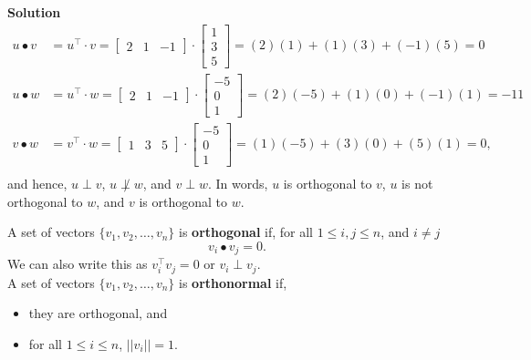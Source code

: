 \textbf{Solution} 
\begin{align*} 
u \bullet v & = u^\top \cdot v =\begin{bmatrix} 2 & 1 & -1\end{bmatrix} \cdot \begin{bmatrix} 1\\ 3\\ 5\end{bmatrix} = (2)(1) + (1) (3) + (-1)(5) = 0 \\
u \bullet w & = u^\top \cdot w =\begin{bmatrix} 2 & 1 & -1\end{bmatrix} \cdot \left[ \begin{array}{r} -5 \\ 0 \\ 1\end{array} \right] = (2)(-5) + (1) (0) + (-1)(1) = -11 \\
v \bullet w & = v^\top \cdot w =\begin{bmatrix} 1 & 3 & 5\end{bmatrix} \cdot \left[ \begin{array}{r} -5 \\ 0 \\ 1\end{array} \right] = (1)(-5) + (3) (0) + (5)(1) = 0,\\
\end{align*}
and hence, $u \perp v$, $u \not \perp w$, and $v \perp w$. In words, $u$ is orthogonal to $v$, $u$ is not orthogonal to $w$, and  $v$ is orthogonal to $w$. \Qed\\




\begin{tcolorbox}[sharp corners, colback=green!30, colframe=green!80!blue, title=\textbf{\Large Orthogonal and Orthonormal Vectors}]
A set of vectors $\{v_1, v_2, \ldots, v_n  \}$ is \textbf{orthogonal} if, for all $1 \le i, j \le n$, and $i\ne j$
\begin{equation}
    \label{eq:OrthognalVectors}
    v_i \bullet v_j =0.
\end{equation}
We can also write this as $v_i^\top v_j = 0$ or $v_i \perp v_j$.\\

A set of vectors $\{v_1, v_2, \ldots, v_n  \}$ is \textbf{orthonormal} if, 
\begin{itemize}
    \item they are orthogonal, and 
    \item for all $1 \le i \le n$, $||v_i||=1.$
\end{itemize}
\end{tcolorbox}

